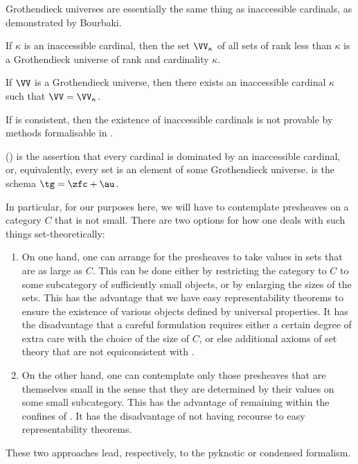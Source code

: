 Grothendieck universes are essentially the same thing as inaccessible cardinals, as demonstrated by Bourbaki.\cite[Exposé I, Appendix]{Anonymous:1972tk}
\begin{proposition}[Bourbaki]
	If $\kappa$ is an inaccessible cardinal, then the set $\VV_{\kappa}$ of all sets of rank less than $\kappa$ is a Grothendieck universe of rank and cardinality $\kappa$.

	If $\VV$ is a Grothendieck universe, then there exists an inaccessible cardinal $\kappa$ such that $\VV=\VV_{\kappa}$.
\end{proposition}

\begin{theorem}
	If \zfc is consistent, then the existence of inaccessible cardinals is not provable by methods formalisable in \zfc.
\end{theorem}

\begin{axiom}%
\label{axm:AU}
	 (\au) is the assertion that every cardinal is dominated by an inaccessible cardinal, or, equivalently, every set is an element of some Grothendieck universe.
	 is the schema $\tg = \zfc+\au$.
\end{axiom}

In particular, for our purposes here,
we will have to contemplate presheaves on a category $C$ that is not small.
There are two options for how one deals with such things set-theoretically:
\begin{enumerate}
	\item On one hand, one can arrange for the presheaves to take values in sets that are as large as $C$.
		This can be done either by restricting the category to $C$ to some subcategory of sufficiently small objects,
		or by enlarging the sizes of the sets.
		This has the advantage that we have easy representability theorems to ensure the existence of various objects defined by universal properties.
		It has the disadvantage that a careful formulation requires either a certain degree of extra care with the choice of the size of $C$,
		or else additional axioms of set theory that are not equiconsistent with \zfc.
	\item On the other hand, one can contemplate only those presheaves that are themselves small in the sense that they are determined by their values on some small subcategory.
		This has the advantage of remaining within the confines of \zfc.
		It has the disadvantage of not having recourse to easy representability theorems.
\end{enumerate}
These two approaches lead, respectively, to the pyknotic or condensed formalism.

